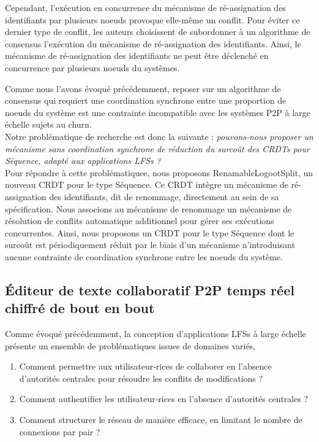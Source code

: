 Cependant, l'exécution en concurrence du mécanisme de ré-assignation des identifiants par plusieurs noeuds provoque elle-même un conflit.
Pour éviter ce dernier type de conflit, les auteurs choisissent de subordonner à un algorithme de consensus l'exécution du mécanisme de ré-assignation des identifiants.
Ainsi, le mécanisme de ré-assignation des identifiants ne peut être déclenché en concurrence par plusieurs noeuds du systèmes.

Comme nous l'avons évoqué précédemment, reposer sur un algorithme de consensus qui requiert une coordination synchrone entre une proportion de noeuds du système est une contrainte incompatible avec les systèmes \ac{P2P} à large échelle sujets au churn.\\

Notre problématique de recherche est donc la suivante : \emph{pouvons-nous proposer un mécanisme sans coordination synchrone de réduction du surcoût des \acp{CRDT} pour Séquence, \ie adapté aux applications \acp{LFS} ?}\\

Pour répondre à cette problématiquee, nous proposons RenamableLogootSplit, un nouveau \ac{CRDT} pour le type Séquence.
Ce \ac{CRDT} intègre un mécanisme de ré-assignation des identifiants, dit de renommage, directement au sein de sa spécification.
Nous associons au mécanisme de renommage un mécanisme de résolution de conflits automatique additionnel pour gérer ses exécutions concurrentes.
Ainsi, nous proposons un \ac{CRDT} pour le type Séquence dont le surcoût est périodiquement réduit par le biais d'un mécanisme n'introduisant aucune contrainte de coordination synchrone entre les noeuds du système.

\subsection{Éditeur de texte collaboratif \ac{P2P} temps réel chiffré de bout en bout}
\label{sec:research-questions-mute}

Comme évoqué précédemment, la conception d'applications \acp{LFS} à large échelle présente un ensemble de problématiques issues de domaines variés, \eg
\begin{enumerate}
    \item Comment permettre aux utilisateur-rices de collaborer en l'absence d'autorités centrales pour résoudre les conflits de modifications ?
    \item Comment authentifier les utilisateur-rices en l'absence d'autorités centrales ?
    \item Comment structurer le réseau de manière efficace, \ie en limitant le nombre de connexions par pair ?
\end{enumerate}

